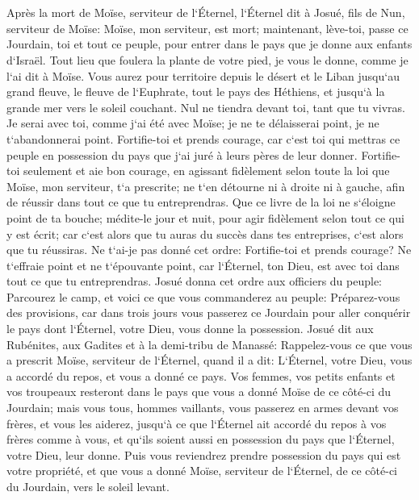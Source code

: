 

\chapter{}

\verse Après la mort de Moïse, serviteur de l`Éternel, l`Éternel dit à Josué, fils de Nun, serviteur de Moïse: 
\verse Moïse, mon serviteur, est mort; maintenant, lève-toi, passe ce Jourdain, toi et tout ce peuple, pour entrer dans le pays que je donne aux enfants d`Israël. 
\verse Tout lieu que foulera la plante de votre pied, je vous le donne, comme je l`ai dit à Moïse. 
\verse Vous aurez pour territoire depuis le désert et le Liban jusqu`au grand fleuve, le fleuve de l`Euphrate, tout le pays des Héthiens, et jusqu`à la grande mer vers le soleil couchant. 
\verse Nul ne tiendra devant toi, tant que tu vivras. Je serai avec toi, comme j`ai été avec Moïse; je ne te délaisserai point, je ne t`abandonnerai point. 
\verse Fortifie-toi et prends courage, car c`est toi qui mettras ce peuple en possession du pays que j`ai juré à leurs pères de leur donner. 
\verse Fortifie-toi seulement et aie bon courage, en agissant fidèlement selon toute la loi que Moïse, mon serviteur, t`a prescrite; ne t`en détourne ni à droite ni à gauche, afin de réussir dans tout ce que tu entreprendras. 
\verse Que ce livre de la loi ne s`éloigne point de ta bouche; médite-le jour et nuit, pour agir fidèlement selon tout ce qui y est écrit; car c`est alors que tu auras du succès dans tes entreprises, c`est alors que tu réussiras. 
\verse Ne t`ai-je pas donné cet ordre: Fortifie-toi et prends courage? Ne t`effraie point et ne t`épouvante point, car l`Éternel, ton Dieu, est avec toi dans tout ce que tu entreprendras. 
\verse Josué donna cet ordre aux officiers du peuple: 
\verse Parcourez le camp, et voici ce que vous commanderez au peuple: Préparez-vous des provisions, car dans trois jours vous passerez ce Jourdain pour aller conquérir le pays dont l`Éternel, votre Dieu, vous donne la possession. 
\verse Josué dit aux Rubénites, aux Gadites et à la demi-tribu de Manassé: 
\verse Rappelez-vous ce que vous a prescrit Moïse, serviteur de l`Éternel, quand il a dit: L`Éternel, votre Dieu, vous a accordé du repos, et vous a donné ce pays. 
\verse Vos femmes, vos petits enfants et vos troupeaux resteront dans le pays que vous a donné Moïse de ce côté-ci du Jourdain; mais vous tous, hommes vaillants, vous passerez en armes devant vos frères, et vous les aiderez, 
\verse jusqu`à ce que l`Éternel ait accordé du repos à vos frères comme à vous, et qu`ils soient aussi en possession du pays que l`Éternel, votre Dieu, leur donne. Puis vous reviendrez prendre possession du pays qui est votre propriété, et que vous a donné Moïse, serviteur de l`Éternel, de ce côté-ci du Jourdain, vers le soleil levant. 
